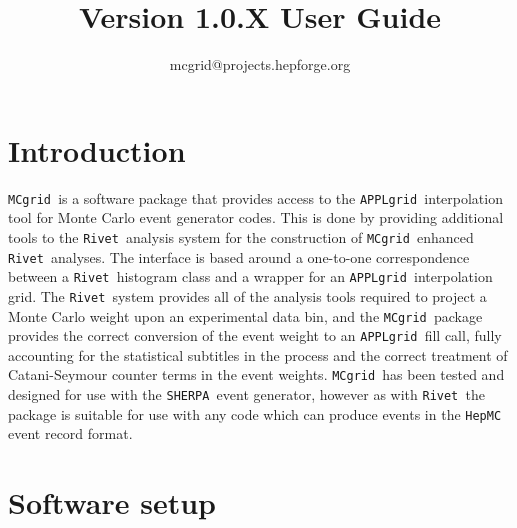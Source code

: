 \documentclass[11pt]{article}
\title{\mcgrid Version 1.0.X User Guide}
\author{mcgrid@projects.hepforge.org}
\newcommand{\mcgrid} {{\tt MCgrid }}
\newcommand{\rivet} {{\tt Rivet }}
\newcommand{\appl} {{\tt APPLgrid }}
\newcommand{\sherpa} {{\tt SHERPA }}
\begin{document}
\date{}
\maketitle
\tableofcontents
\section{Introduction}
\mcgrid is a software package that provides access to the \appl interpolation tool for Monte Carlo event generator codes. This is done by providing additional tools to the \rivet analysis system for the construction of \mcgrid enhanced \rivet analyses. The interface is based around a one-to-one correspondence between a \rivet histogram class and a wrapper for an \appl interpolation grid. The \rivet system provides all of the analysis tools required to project a Monte Carlo weight upon an experimental data bin, and the \mcgrid package provides the correct conversion of the event weight to an \appl fill call, fully accounting for the statistical subtitles in the process and the correct treatment of Catani-Seymour counter terms in the event weights. \mcgrid has been tested and designed for use with the \sherpa event generator, however as with \rivet the package is suitable for use with any code which can produce events in the {\tt HepMC} event record format.
\clearpage

\section{Software setup}
\end{document}
